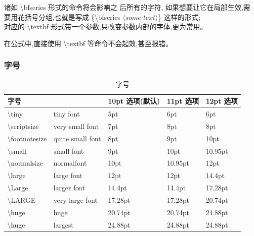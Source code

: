 \documentclass[a4paper]{ctexart}
\begin{document}
    诸如 \textbackslash bfseries 形式的命令将会影响之 后所有的字符,%
    如果想要让它在局部生效,需要用花括号分组,也就是写成 \{\textbackslash bfseries %
    $\langle some\;text\rangle$\} 这样的形式;\\
    对应的 \textbackslash textbf 形式带一个参数,只改变参数内部的字体,更为常用。\par
    在公式中,直接使用 \textbackslash textbf 等命令不会起效,甚至报错。\par
    \subsubsection{字号}
    \begin{table}[H]
        \centering
        \caption{字号}\label{字号}
        \begin{tabular}{lllll}
            \toprule
            \multicolumn{2}{l}{\bf{字号}}   
            &\bf{10pt 选项(默认)}    &\bf{11pt 选项}  &\bf{12pt 选项}         \\
            \midrule
            \textbackslash tiny             &\tiny tiny font                
            &5pt                    &6pt            &6pt                    \\
            \textbackslash scriptsize       &\scriptsize very small font    
            &7pt                    &8pt            &8pt                    \\
            \textbackslash footnotesize     &\footnotesize quite small font 
            &8pt                    &9pt            &10pt                   \\
            \textbackslash small            &\small small font              
            &9pt                    &10pt           &10.95pt                \\
            \textbackslash normalsize       &\normalsize normalfont         
            &10pt                   &10.95pt        &12pt                   \\
            \textbackslash large            &\large large font              
            &12pt                   &12pt           &14.4pt                 \\
            \textbackslash Large            &\Large larger font     
            &14.4pt                 &14.4pt         &17.28pt                \\
            \textbackslash LARGE            &\LARGE very large font 
            &17.28pt                &17.28pt        &20.74pt                \\
            \textbackslash huge             &\huge huge             
            &20.74pt                &20.74pt        &24.88pt                \\ 
            \textbackslash huge             &\huge largest          
            &24.88pt                &24.88pt        &24.88pt                \\
            \bottomrule
        \end{tabular}
    \end{table}
\end{document}
